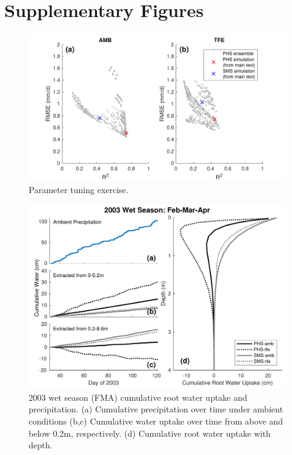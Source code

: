 \documentclass[draft,linenumbers]{agujournal}
\begin{document}
\clearpage

\appendix

\section{Supplementary Figures}


      \begin{figure}[h]
     \centering
     \includegraphics[width=30pc]{../figs3/ens.pdf}
     \caption{Parameter tuning exercise.
     }
     \label{supp:ens}
       \end{figure}
         \clearpage

        \clearpage
    \begin{figure}[h]
     \centering
     \includegraphics[width=30pc]{../figs3/qwet.pdf}
     \caption{2003 wet season (FMA) cumulative root water uptake and precipitation. 
     (a) Cumulative precipitation over time under ambient conditions
     (b,c) Cumulative water uptake over time from above and below 0.2m, respectively.
     (d) Cumulative root water uptake with depth.
     }
     \label{fig:qwet}
  \end{figure}
\end{document}

